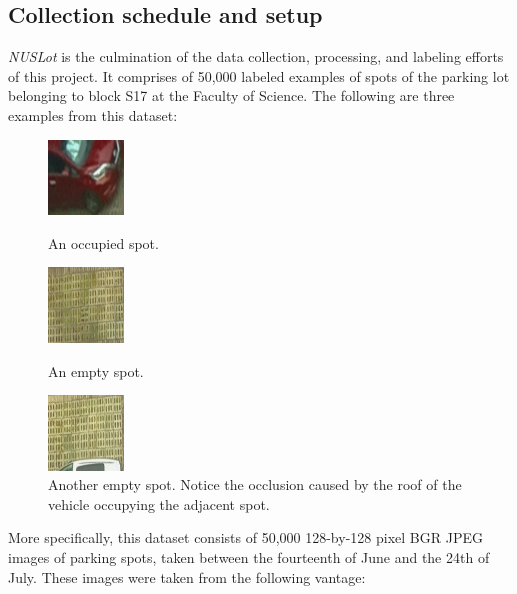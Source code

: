 \documentclass[a4paper, 11pt]{article} %
\begin{document}
	\subsection{Collection schedule and setup}
		\textit{NUSLot} is the culmination of the data collection, processing, and labeling efforts of this 
		project. It comprises of 50,000 labeled examples of spots of the 
		parking lot belonging to block 
		S17 at the Faculty of Science. The following are 
		three examples from this dataset:
		\vskip 5mm
		\begin{figure}[H]
			\centering
			\includegraphics[width=2cm]{figures/nuslot_example_1.jpg}
			\caption{An occupied spot.}
			\vspace{5mm}
			\includegraphics[width=2cm]{figures/nuslot_example_2.jpg}
			\caption{An empty spot.}
			\vspace{5mm}
			\includegraphics[width=2cm]{figures/nuslot_example_3.jpg}
			\caption{Another empty spot. Notice the occlusion caused by the roof of the vehicle occupying 
			the adjacent spot.}
		\end{figure}
		\hspace*{-6mm}More specifically, this dataset consists of 50,000 
		128-by-128 pixel BGR JPEG images of 
		parking spots, taken between the fourteenth of June and the 24th of July. These images were taken 
		from the following vantage:
		\vskip 5mm
\end{document}
